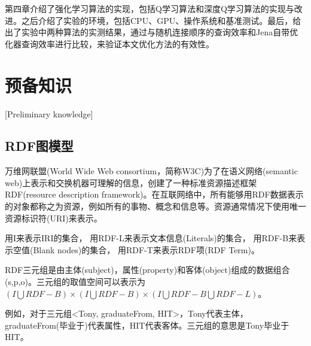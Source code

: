 第四章介绍了强化学习算法的实现，包括Q学习算法和深度Q学习算法的实现与改进。之后介绍了实验的环境，包括CPU、GPU、操作系统和基准测试。最后，给出了实验中两种算法的实测结果，通过与随机连接顺序的查询效率和Jena自带优化器查询效率进行比较，来验证本文优化方法的有效性。

\chapter{预备知识}[Preliminary knowledge]

\section{RDF图模型}

万维网联盟(World Wide Web consortium，简称W3C)为了在语义网络(semantic web)上表示和交换机器可理解的信息，创建了一种标准资源描述框架RDF(resource description framework)。在互联网络中，所有能够用RDF数据表示的对象都称之为资源，例如所有的事物、概念和信息等。资源通常情况下使用唯一资源标识符(URI)来表示。

 \begin{definition}    
    用I来表示IRI的集合，
    用RDF-L来表示文本信息(Literals)的集合，
    用RDF-B来表示空值(Blank nodes)的集合，
    用RDF-T来表示RDF项(RDF Term)。
\end{definition}

\begin{definition}[（RDF三元组）]    
    RDF三元组是由主体(subject)，属性(property)和客体(object)组成的数据组合(s,p,o)。三元组的取值空间可以表示为$(I\bigcup RDF-B)\times(I\bigcup RDF-B)\times(I\bigcup RDF-B\bigcup RDF-L)$。
    
    例如，对于三元组<Tony, graduateFrom, HIT>，Tony代表主体，graduateFrom(毕业于)代表属性，HIT代表客体。三元组的意思是Tony毕业于HIT。
\end{definition}


